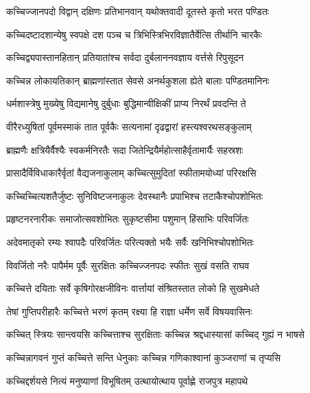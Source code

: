 \twolineshloka
{कच्चिज्जानपदो विद्वान् दक्षिणः प्रतिभानवान्}
{यथोक्तवादी दूतस्ते कृतो भरत पण्डितः} %

\twolineshloka
{कच्चिदष्टादशान्येषु स्वपक्षे दश पञ्च च}
{त्रिभिस्त्रिभिरविज्ञातैर्वेत्सि तीर्थानि चारकैः} %

\twolineshloka
{कच्चिद्व्यपास्तानहितान् प्रतियातांश्च सर्वदा}
{दुर्बलाननवज्ञाय वर्त्तसे रिपुसूदन} %

\twolineshloka
{कच्चिन्न लोकायतिकान् ब्राह्मणांस्तात सेवसे}
{अनर्थकुशला ह्येते बालाः पण्डितमानिनः} %

\twolineshloka
{धर्मशास्त्रेषु मुख्येषु विद्यमानेषु दुर्बुधाः}
{बुद्धिमान्वीक्षिकीं प्राप्य निरर्थं प्रवदन्ति ते} %

\twolineshloka
{वीरैरध्युषितां पूर्वमस्माकं तात पूर्वकैः}
{सत्यनामां दृढद्वारां हस्त्यश्वरथसङ्कुलाम्} %

\twolineshloka
{ब्राह्मणैः क्षत्रियैर्वैश्यैः स्वकर्मनिरतैः सदा}
{जितेन्द्रियैर्महोत्साहैर्वृतामार्यैः सहस्रशः} %

\twolineshloka
{प्रासादैर्विविधाकारैर्वृतां वैद्यजनाकुलाम्}
{कच्चित्सुमुदितां स्फीतामयोध्यां परिरक्षसि} %

\twolineshloka
{कच्चिच्चित्यशतैर्जुष्टः सुनिविष्टजनाकुलः}
{देवस्थानैः प्रपाभिश्च तटाकैश्चोपशोभितः} %

\twolineshloka
{प्रहृष्टनरनारीकः समाजोत्सवशोभितः}
{सुकृष्टसीमा पशुमान् हिंसाभिः परिवर्जितः} %

\twolineshloka
{अदेवमातृको रम्यः श्वापदैः परिवर्जितः}
{परित्यक्तो भयैः सर्वैः खनिभिश्चोपशोभितः} %

\twolineshloka
{विवर्जितो नरैः पापैर्मम पूर्वैः सुरक्षितः}
{कच्चिज्जनपदः स्फीतः सुखं वसति राघव} %

\twolineshloka
{कच्चित्ते दयिताः सर्वे कृषिगोरक्षजीविनः}
{वार्त्तायां संश्रितस्तात लोको हि सुखमेधते} %

\twolineshloka
{तेषां गुप्तिपरीहारैः कच्चित्ते भरणं कृतम्}
{रक्ष्या हि राज्ञा धर्मेण सर्वे विषयवासिनः} %

\twolineshloka
{कच्चित् स्त्रियः सान्त्वयसि कच्चित्ताश्च सुरक्षिताः}
{कच्चिन्न श्रद्दधास्यासां कच्चिद् गुह्यं न भाषसे} %

\twolineshloka
{कच्चिन्नागवनं गुप्तं कच्चित्ते सन्ति धेनुकाः}
{कच्चिन्न गणिकाश्वानां कुञ्जराणां च तृप्यसि} %

\twolineshloka
{कच्चिद्दर्शयसे नित्यं मनुष्याणां विभूषितम्}
{उत्थायोत्थाय पूर्वाह्णे राजपुत्र महापथे} %


